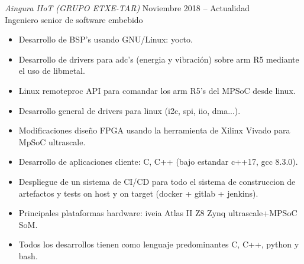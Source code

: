 \documentclass[10pt]{res} %
\begin{document}
\begin{resume}
{\sl Aingura IIoT (GRUPO ETXE-TAR)} \hfill Noviembre 2018 -- Actualidad\\
\hfill Ingeniero senior de software embebido
\begin{itemize} \itemsep -2pt %
\item Desarrollo de BSP's usando GNU/Linux: yocto.
\item Desarrollo de drivers para adc's (energia y vibración) sobre arm R5 mediante el uso de libmetal.
\item Linux remoteproc API para comandar los arm R5's del MPSoC desde linux.
\item Desarrollo general de drivers para linux (i2c, spi, iio, dma...).
\item Modificaciones diseño FPGA usando la herramienta de Xilinx Vivado para MpSoC ultrascale.
\item Desarrollo de aplicaciones cliente: C, C++ (bajo estandar c++17, gcc 8.3.0).
\item Despliegue de un sistema de CI/CD para todo el sistema de construccion de artefactos y tests on host y on target (docker + gitlab + jenkins).
\item Principales plataformas hardware: iveia Atlas II Z8 Zynq ultrascale+MPSoC SoM.
\item Todos los desarrollos tienen como lenguaje predominantes C, C++, python y bash. 
\end{itemize}


\end{resume}
\end{document}
